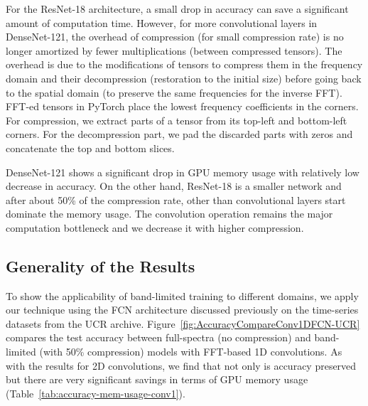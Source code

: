 For the ResNet-18 architecture, a small drop in accuracy can save a significant amount of computation time. However, for more convolutional layers in DenseNet-121, the overhead of compression (for small compression rate) is no longer amortized by fewer multiplications (between compressed tensors). The overhead is due to the modifications of tensors to compress them in the frequency domain and their decompression (restoration to the initial size) before going back to the spatial domain (to preserve the same frequencies for the inverse FFT). FFT-ed tensors in PyTorch place the lowest frequency coefficients in the corners. For compression, we extract parts of a tensor from its top-left and bottom-left corners. For the decompression part, we pad the discarded parts with zeros and concatenate the top and bottom slices. %

DenseNet-121 shows a significant drop in GPU memory usage with relatively low decrease in accuracy. On the other hand, ResNet-18 is a smaller network and after about 50\% of the compression rate, other than convolutional layers start dominate the memory usage. The convolution operation remains the major computation bottleneck and we decrease it with higher compression. %

\subsection{Generality of the Results} To show the applicability of band-limited training to different domains, we apply our technique using the FCN architecture discussed previously on the time-series datasets from the UCR archive. Figure~\ref{fig:AccuracyCompareConv1DFCN-UCR} compares the test accuracy between full-spectra (no compression) and band-limited (with 50\% compression) models with FFT-based 1D convolutions. %
As with the results for 2D convolutions, we find that not only is accuracy preserved but there are very significant savings in terms of GPU memory usage (Table~\ref{tab:accuracy-mem-usage-conv1}).

